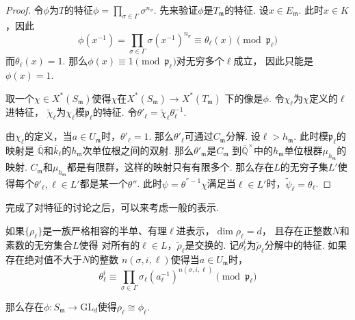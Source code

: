 \begin{proof}
    令$\phi$为$T$的特征$\phi = \prod_{\sigma\in \Gamma} \sigma^{n_{\sigma}}$.
    先来验证$\phi$是$T_{\mathfrak{m}}$的特征. 设$x\in E_{\mathfrak{m}}$.
    此时$x\in K$，因此
    \begin{equation}
        \phi(x^{-1}) = \prod_{\sigma\in\Gamma}\sigma(x^{-1})^{n_{\sigma}}
        \equiv \theta_{\ell}(x) \pmod{\mathfrak{p}_{\ell}}
    \end{equation}
    而$\theta_{\ell}(x) = 1$. 那么$\phi(x)\equiv 1\pmod{\mathfrak{p}_{\ell}}$对无穷多个$\ell$成立，
    因此只能是$\phi(x) = 1$.

    取一个$\chi\in X^{*}(S_{\mathfrak{m}})$使得$\chi$在$X^{*}(S_{\mathfrak{m}})\to X^{*}(T_{\mathfrak{m}})$
    下的像是$\phi$. 令$\chi_{\ell}$为$\chi$定义的$\ell$进特征，
    $\tilde{\chi}_{\ell}$为$\chi_{\ell}$模$\mathfrak{p}_{\ell}$的特征.
    令$\theta'_{\ell} = \tilde{\chi}_{\ell} \theta_{\ell}^{-1}$.

    由$\chi_{\ell}$的定义，当$a\in U_{\mathfrak{m}}$时，$\theta'_{\ell}=1$.
    那么$\theta'_{\ell}$可通过$C_{\mathfrak{m}}$分解.
    设$\ell > h_{\mathfrak{m}}$.
    此时模$\mathfrak{p}_{\ell}$的映射是
    $\overline{\mathbb{Q}}$和$\overline{k}_{\ell}$的$h_{\mathfrak{m}}$次单位根之间的双射.
    那么$\theta'_{\mathfrak{m}}$是$C_{\mathfrak{m}}$
    到$\overline{\mathbb{Q}}^{\times}$中的$h_{\mathfrak{m}}$单位根群$\mu_{h_{\mathfrak{m}}}$的映射.
    $C_{\mathfrak{m}}$和$\mu_{h_{\mathfrak{m}}}$都是有限群，这样的映射只有有限多个.
    那么存在$L$的无穷子集$L'$使得每个$\theta'_{\ell},\ell\in L'$都是某一个$\theta''$.
    此时$\psi = \theta^{''-1}\chi$满足当$\ell\in L'$时，$\tilde{\psi}_{\ell} = \theta_{\ell}$.
\end{proof}

完成了对特征的讨论之后，可以来考虑一般的表示.

\begin{cthm}
    如果$\{\rho_{\ell}\}$是一族严格相容的半单、有理$\ell$进表示，$\dim \rho_{\ell} = d$，
    且存在正整数$N$和素数的无穷集合$L$使得
    对所有的$\ell\in L$，$\tilde{\rho}_{\ell}$是交换的. 记$\theta_{\ell}^i$为$\tilde{\rho}_{\ell}$分解中的特征.
    如果存在绝对值不大于$N$的整数
    $n(\sigma,i,\ell)$使得当$a\in U_{\mathfrak{m}}$时，
    \begin{equation}
        \theta_{\ell}^i \equiv \prod_{\sigma\in \Gamma} \sigma_{\ell}(a_{\ell}^{-1})^{n(\sigma, i, \ell)} \pmod{\mathfrak{p}_{\ell}}
    \end{equation}

    那么存在$\phi:S_{\mathfrak{m}}\to \mathrm{GL}_d$使得$\rho_{\ell}\cong \phi_{\ell}$. \label{surj::main_lemma}
\end{cthm}

